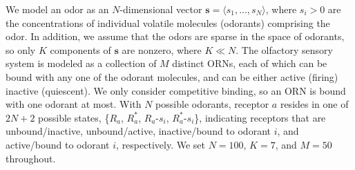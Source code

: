 We model an odor as an $N$-dimensional vector $\mathbf s = \langle s_1,...,s_N\rangle$, where $s_i > 0$ are the concentrations of individual volatile molecules (odorants) comprising the odor. In addition, we assume that the odors are sparse in the space of odorants, so only $K$ components of $\mathbf s$ are nonzero, where $K \ll N$. The olfactory sensory system is modeled as a collection of $M$ distinct ORNs, each of which can be bound with any one of the odorant molecules, and can be either active (firing) inactive (quiescent). We only consider competitive binding, so an ORN is bound with one odorant at most. With $N$ possible odorants, receptor $a$ resides in one of $2N+2$ possible states, \{$R_a$, $R^*_a$, $R_a$-$s_i$, $R^*_a$-$s_i$\}, indicating receptors that are unbound/inactive, unbound/active, inactive/bound to odorant $i$, and active/bound to odorant $i$, respectively. We set $N = 100$, $K = 7$, and $M = 50$ throughout. 


